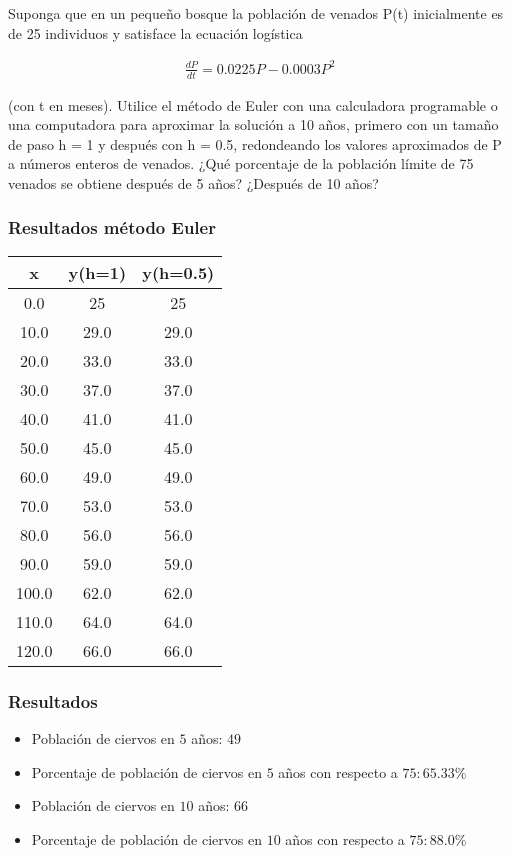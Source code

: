 \documentclass[a4paper.10pt]{article}
\begin{document}
Suponga que en un peque\~no bosque la poblaci\'on de venados P(t) inicialmente es de 25 individuos y satisface la ecuaci\'on log\'istica

\begin{equation*}
    \begin{aligned}
        \frac{dP}{dt} = 0.0225P - 0.0003P^{2}
    \end{aligned}
\end{equation*}

(con t en meses). Utilice el m\'etodo de Euler con una calculadora programable o una computadora para aproximar la soluci\'on a 10 a\~nos, primero con un tama\~no de paso h = 1 y despu\'es con h = 0.5, redondeando los valores aproximados de P a n\'umeros enteros de venados. ¿Qu\'e porcentaje de la poblaci\'on l\'imite de 75 venados se obtiene despu\'es de 5 a\~nos? ¿Despu\'es de 10 a\~nos?

\subsubsection{Resultados m\'etodo Euler}

\begin{table}[h]
    \centering
    \begin{tabular}{|c|c|c|}
        \hline
        x     & y(h=1) & y(h=0.5) \\
        \hline
        0.0   & 25     & 25       \\
        10.0  & 29.0   & 29.0     \\
        20.0  & 33.0   & 33.0     \\
        30.0  & 37.0   & 37.0     \\
        40.0  & 41.0   & 41.0     \\
        50.0  & 45.0   & 45.0     \\
        60.0  & 49.0   & 49.0     \\
        70.0  & 53.0   & 53.0     \\
        80.0  & 56.0   & 56.0     \\
        90.0  & 59.0   & 59.0     \\
        100.0 & 62.0   & 62.0     \\
        110.0 & 64.0   & 64.0     \\
        120.0 & 66.0   & 66.0     \\
        \hline
    \end{tabular}
\end{table}

\subsubsection{Resultados}
\begin{itemize}
    \item Poblaci\'on de ciervos en $5$ a\~nos: $49$
    \item Porcentaje de poblaci\'on de ciervos en $5$ a\~nos con respecto a $75: 65.33\%$
    \item Poblaci\'on de ciervos en $10$ a\~nos: $66$
    \item Porcentaje de poblaci\'on de ciervos en $10$ a\~nos con respecto a $75: 88.0\%$
\end{itemize}
\end{document}
